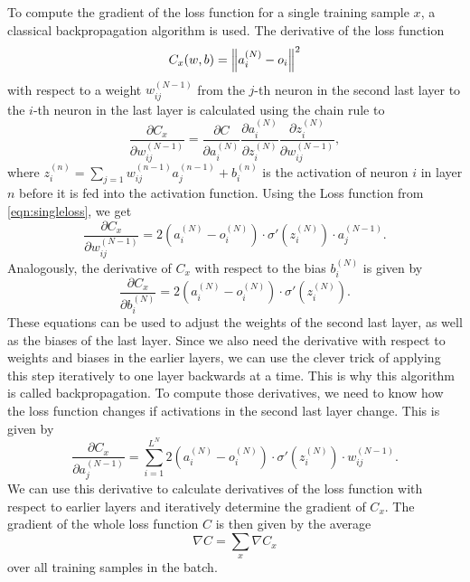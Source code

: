 To compute the gradient of the loss function for a single training sample $x$, a classical backpropagation algorithm is used. The derivative of the loss function
\begin{equation}
  \label{eqn:singleloss}
  C_x(w, b) = \left\lVert a_i^{(N)}-o_i\right\rVert^2
\end{equation}
with respect to a weight $w_{ij}^{(N-1)}$ from the $j$-th neuron in the second last layer to the $i$-th neuron in the last layer is calculated using the chain rule to
\begin{equation}
  \frac{\partial C_x}{\partial w_{ij}^{(N-1)}} = \frac{\partial C}{\partial a_i^{(N)}}\frac{\partial a_i^{(N)}}{\partial z_i^{(N)}} \frac{\partial z_i^{(N)}}{\partial w_{ij}^{(N-1)}},
\end{equation}
where $z_i^{(n)} = \sum_{j=1} w_{ij}^{(n-1)}a_j^{(n-1)}+b_i^{(n)}$ is the activation of neuron $i$ in layer $n$ before it is fed into the activation function. Using the Loss function from \eqref{eqn:singleloss}, we get
\begin{equation}
  \frac{\partial C_x}{\partial w_{ij}^{(N-1)}} = 2(a_i^{(N)}-o_i^{(N)}) \cdot \sigma'(z_i^{(N)}) \cdot a_j^{(N-1)}.
\end{equation}
Analogously, the derivative of $C_x$ with respect to the bias $b_i^{(N)}$ is given by
\begin{equation}
  \frac{\partial C_x}{\partial b_i^{(N)}} = 2(a_i^{(N)}-o_i^{(N)}) \cdot \sigma'(z_i^{(N)}).
\end{equation}
These equations can be used to adjust the weights of the second last layer, as well as the biases of the last layer. Since we also need the derivative with respect to weights and biases in the earlier layers, we can use the clever trick of applying this step iteratively to one layer backwards at a time. This is why this algorithm is called backpropagation. To compute those derivatives, we need to know how the loss function changes if activations in the second last layer change. This is given by
\begin{equation}
  \frac{\partial C_x}{\partial a_j^{(N-1)}} =\sum_{i=1}^{L^{N}} 2(a_i^{(N)}-o_i^{(N)}) \cdot \sigma'(z_i^{(N)}) \cdot w_{ij}^{(N-1)}.
\end{equation}
We can use this derivative to calculate derivatives of the loss function with respect to earlier layers and iteratively determine the gradient of $C_x$. The gradient of the whole loss function $C$ is then given by the average
\begin{equation}
  \nabla C = \sum_{x} \nabla C_x
\end{equation}
over all training samples in the batch.
